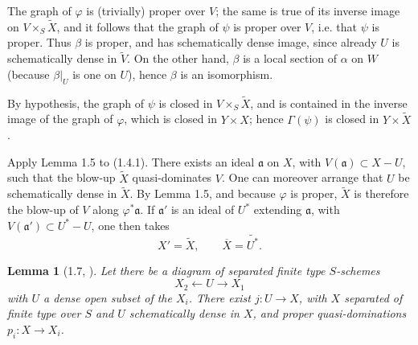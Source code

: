 \documentclass[10pt,a4paper]{article}
\theoremstyle{deligne}
\newtheorem*{lemma*}{Lemma}
\begin{document}
The graph of \(\varphi\) is (trivially) proper over \(V\); the same is true of its inverse image on \(V\times_S\widetilde X\), and it follows that the graph of \(\psi\) is proper over \(V\), i.e. that \(\psi\) is proper. Thus \(\beta\) is proper, and has schematically dense image, since already \(U\) is schematically dense in \(\widetilde V\). On the other hand, \(\beta\) is a local section of \(\alpha\) on \(W\) (because \(\beta|_U\) is one on \(U\)), hence \(\beta\) is an isomorphism.

By hypothesis, the graph of \(\psi\) is closed in \(V\times_S\widetilde X\), and is contained in the inverse image of the graph of \(\varphi\), which is closed in \(Y\times X\); hence \(\Gamma(\psi)\) is closed in \(Y\times\widetilde X\).

Apply Lemma 1.5 to (1.4.1). There exists an ideal \(\mathfrak a\) on \(X\), with \(V(\mathfrak a)\subset X-U\), such that the blow-up \(\widetilde X\) quasi-dominates \(V\). One can moreover arrange that \(U\) be schematically dense in \(\widetilde X\). By Lemma 1.5, and because \(\varphi\) is proper, \(\widetilde X\) is therefore the blow-up of \(V\) along \(\varphi^*\mathfrak a\). If \(\mathfrak a'\) is an ideal of \(U^*\) extending \(\mathfrak a\), with \(V(\mathfrak a')\subset U^*-U\), one then takes
\[
X'=\widetilde X,
\qquad
\overline X=\widetilde{U^*}.
\]

\begin{lemma*}[1.7, {\normalfont [2, Lemma 4.2]}]
Let there be a diagram of separated finite type \(S\)-schemes
\[
X_2\xleftarrow{} U \xrightarrow{} X_1
\]
with \(U\) a dense open subset of the \(X_i\). There exist \(j:U\to X\), with \(X\) separated of finite type over \(S\) and \(U\) schematically dense in \(X\), and proper quasi-dominations \(p_i:X\to X_i\).
\end{lemma*}
\end{document}
